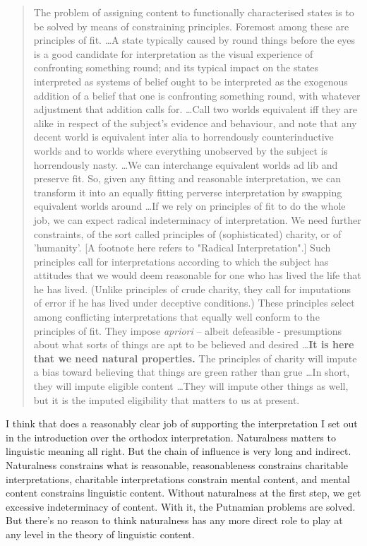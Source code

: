 \begin{quote}
The problem of assigning content to functionally characterised states is to be solved by means of constraining principles. Foremost among these are principles of fit. \dots A state typically caused by round things before the eyes is a good candidate for interpretation as the visual experience of confronting something round; and its typical impact on the states interpreted as systems of belief ought to be interpreted as the exogenous addition of a belief that one is confronting something round, with whatever adjustment that addition calls for. \dots Call two worlds equivalent iff they are alike in respect of the subject's evidence and behaviour, and note that any decent world is equivalent inter alia to horrendously counterinductive worlds and to worlds where everything unobserved by the subject is horrendously nasty. \dots We can interchange equivalent worlds ad lib and preserve fit. So, given any fitting and reasonable interpretation, we can transform it into an equally fitting perverse interpretation by swapping equivalent worlds around \dots If we rely on principles of fit to do the whole job, we can expect radical indeterminacy of interpretation. We need further constraints, of the sort called principles of (sophisticated) charity, or of 'humanity'. [A footnote here refers to "Radical Interpretation".] Such principles call for interpretations according to which the subject has attitudes that we would deem reasonable for one who has lived the life that he has lived. (Unlike principles of crude charity, they call for imputations of error if he has lived under deceptive conditions.) These principles select among conflicting interpretations that equally well conform to the principles of fit. They impose \textit{apriori} -- albeit defeasible - presumptions about what sorts of things are apt to be believed and desired \dots \textbf{It is here that we need natural properties.} The principles of charity will impute a bias toward believing that things are green rather than grue \dots In short, they will impute eligible content \dots They will impute other things as well, but it is the imputed eligibility that matters to us at present. \citep[373-5, my emphasis]{Lewis1983e}
\end{quote}

\noindent I think that does a reasonably clear job of supporting the interpretation I set out in the introduction over the orthodox interpretation. Naturalness matters to linguistic meaning all right. But the chain of influence is very long and indirect. Naturalness constrains what is reasonable, reasonableness constrains charitable interpretations, charitable interpretations constrain mental content, and mental content constrains linguistic content. Without naturalness at the first step, we get excessive indeterminacy of content. With it, the Putnamian problems are solved. But there's no reason to think naturalness has any more direct role to play at any level in the theory of linguistic content. 

